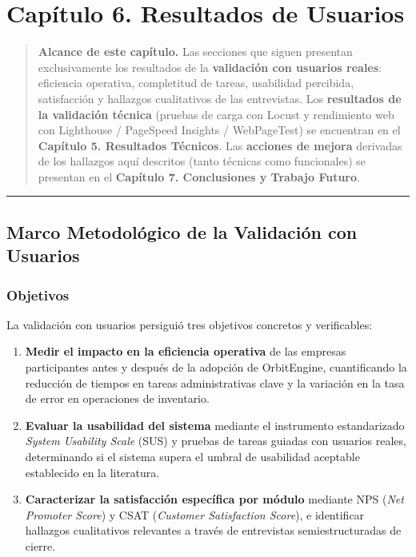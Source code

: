 \chapter{Capítulo 6. Resultados de Usuarios}\label{capuxedtulo-6.-resultados-de-usuarios}

\begin{quote}
\textbf{Alcance de este capítulo.} Las secciones que siguen presentan exclusivamente los resultados de la \textbf{validación con usuarios reales}: eficiencia operativa, completitud de tareas, usabilidad percibida, satisfacción y hallazgos cualitativos de las entrevistas. Los \textbf{resultados de la validación técnica} (pruebas de carga con Locust y rendimiento web con Lighthouse / PageSpeed Insights / WebPageTest) se encuentran en el \textbf{Capítulo 5. Resultados Técnicos}. Las \textbf{acciones de mejora} derivadas de los hallazgos aquí descritos (tanto técnicas como funcionales) se presentan en el \textbf{Capítulo 7. Conclusiones y Trabajo Futuro}.
\end{quote}

\begin{center}\rule{0.5\linewidth}{0.5pt}\end{center}

\section{Marco Metodológico de la Validación con Usuarios}\label{marco-metodoluxf3gico-de-la-validaciuxf3n-con-usuarios}

\subsection{Objetivos}\label{objetivos}

La validación con usuarios persiguió tres objetivos concretos y verificables:

\begin{enumerate}
\def\labelenumi{\arabic{enumi}.}
\tightlist
\item
  \textbf{Medir el impacto en la eficiencia operativa} de las empresas participantes antes y después de la adopción de OrbitEngine, cuantificando la reducción de tiempos en tareas administrativas clave y la variación en la tasa de error en operaciones de inventario.
\item
  \textbf{Evaluar la usabilidad del sistema} mediante el instrumento estandarizado \emph{System Usability Scale} (SUS) y pruebas de tareas guiadas con usuarios reales, determinando si el sistema supera el umbral de usabilidad aceptable establecido en la literatura.
\item
  \textbf{Caracterizar la satisfacción específica por módulo} mediante NPS (\emph{Net Promoter Score}) y CSAT (\emph{Customer Satisfaction Score}), e identificar hallazgos cualitativos relevantes a través de entrevistas semiestructuradas de cierre.
\end{enumerate}

